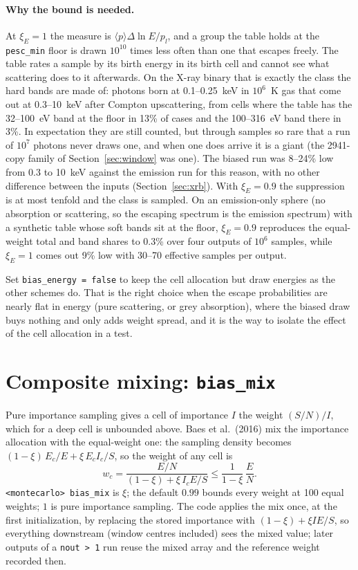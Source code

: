 \documentclass[11pt]{article}
\newcommand{\key}[1]{\texttt{#1}}
\begin{document}
\paragraph{Why the bound is needed.} At $\xi_E = 1$ the measure is
$\langle p\rangle\Delta\ln E/p_l$, and a group the table holds at the \key{pesc\_min}
floor is drawn $10^{10}$ times less often than one that escapes freely. The table rates
a sample by its birth energy in its birth cell and cannot see what scattering does to
it afterwards. On the X-ray binary that is exactly the class the hard bands are made of:
photons born at 0.1--0.25~keV in $10^6$~K gas that come out at 0.3--10~keV after
Compton upscattering, from cells where the table has the 32--100~eV band at the floor
in 13\% of cases and the 100--316~eV band there in 3\%. In expectation they are still
counted, but through samples so rare that a run of $10^7$ photons never draws one,
and when one does arrive it is a giant (the 2941-copy family of
Section~\ref{sec:window} was one). The biased run was 8--24\% low from 0.3 to 10~keV
against the emission run for this reason, with no other difference between the inputs
(Section~\ref{sec:xrb}). With $\xi_E = 0.9$ the suppression is at most tenfold and the
class is sampled. On an emission-only sphere (no absorption or scattering, so the
escaping spectrum is the emission spectrum) with a synthetic table whose soft bands sit
at the floor, $\xi_E = 0.9$ reproduces the equal-weight total and band shares to 0.3\%
over four outputs of $10^6$ samples, while $\xi_E = 1$ comes out 9\% low with 30--70
effective samples per output.

Set \key{bias\_energy = false} to keep the cell allocation but draw energies as the
other schemes do. That is the right choice when the escape probabilities are nearly flat
in energy (pure scattering, or grey absorption), where the biased draw buys nothing and
only adds weight spread, and it is the way to isolate the effect of the cell allocation
in a test.

\section{Composite mixing: \key{bias\_mix}}

Pure importance sampling gives a cell of importance $I$ the weight $(S/N)/I$, which for a
deep cell is unbounded above. Baes et al.\ (2016) mix the importance allocation with the
equal-weight one: the sampling density becomes $(1-\xi)\,E_c/E + \xi\,E_c I_c/S$, so the
weight of any cell is
\begin{equation}
  w_c = \frac{E/N}{(1-\xi) + \xi\, I_c E/S} \le \frac{1}{1-\xi}\,\frac{E}{N}.
\end{equation}
\key{<montecarlo> bias\_mix} is $\xi$; the default $0.99$ bounds every weight at 100
equal weights; $1$ is pure importance sampling. The code applies the mix once, at the
first initialization, by replacing the stored importance with $(1-\xi) + \xi I E/S$,
so everything downstream (window centres included) sees the mixed value; later outputs
of a \key{nout > 1} run reuse the mixed array and the reference weight recorded then.
\end{document}
